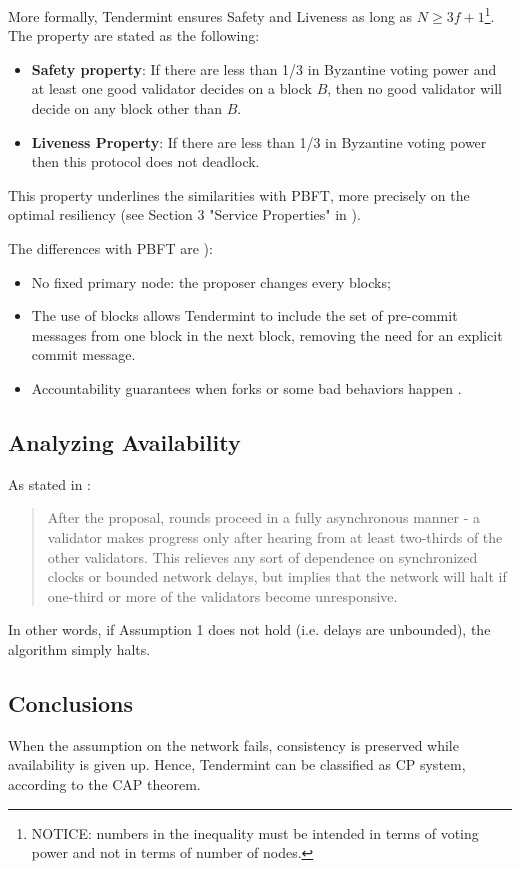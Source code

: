 \documentclass[]{article}
\begin{document}
More formally, Tendermint ensures Safety and Liveness \cite[Section 6.3 and 6.4]{tpaper} as long as $N \ge 3f + 1$\footnote{NOTICE: numbers in the inequality must be intended in terms of voting power and not in terms of number of nodes.}.
The property are stated as the following:
\begin{itemize}
\item \textbf{Safety property}: If there are less than 1/3 in Byzantine voting power and at least one good validator decides on a block $B$, then no good validator will decide on any block other than $B$. 

\item \textbf{Liveness Property}: If there are less than 1/3 in Byzantine voting power then this protocol does not deadlock.
\end{itemize}
This property underlines the similarities with PBFT, more precisely on the optimal resiliency (see Section 3 "Service Properties" in \cite{pbft}).

The differences with PBFT are \cite[Section 10.2.4]{tthesis}):
\begin{itemize}
\item No fixed primary node: the proposer changes every blocks;
\item The use of blocks allows Tendermint to include the set of pre-commit messages from one block in the next block, removing the need for an explicit commit message.
\item Accountability guarantees when forks or some bad behaviors happen \cite[Section 3.5]{tthesis}.
\end{itemize}

\subsection{Analyzing Availability}
As stated in \cite[Section 3.2: Consensus]{tthesis}:
\blockquote{
	After the proposal, rounds proceed in a fully asynchronous manner - a validator makes progress only after hearing from at least two-thirds of the other validators. This relieves any sort of dependence on synchronized clocks or bounded network delays, but implies that the network will halt if one-third or more of the validators become unresponsive.}

In other words, if Assumption 1 does not hold (i.e. delays are unbounded), the algorithm simply halts.
\subsection{Conclusions}
When the assumption on the network fails, consistency is preserved while availability is given up. Hence, Tendermint can be classified as CP system, according to the CAP theorem.
\end{document}
